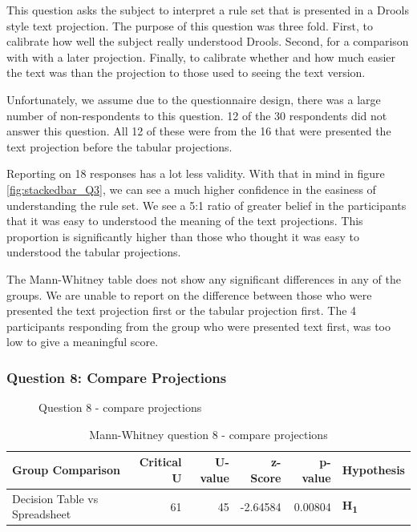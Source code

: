This question asks the subject to interpret a rule set that is presented in a Drools style text projection.
The purpose of this question was three fold.
First, to calibrate how well the subject really understood Drools.
Second, for a comparison with with a later projection.
Finally, to calibrate whether and how much easier the text was than the projection to those used to seeing the text version.

Unfortunately, we assume due to the questionnaire design, there was a large number of non-respondents to this question. 
12 of the 30 respondents did not answer this question.
All 12 of these were from the 16 that were presented the text projection before the tabular projections.

Reporting on 18 responses has a lot less validity.
With that in mind in figure \ref{fig:stackedbar_Q3}, we can see a much higher confidence in the easiness of understanding the rule set.
We see a 5:1 ratio of greater belief in the participants that it was easy to understood the meaning of the text projections.
This proportion is significantly higher than those who thought it was easy to understood the tabular projections.

The Mann-Whitney table does not show any significant differences in any of the groups.
We are unable to report on the difference between those who were presented the text projection first or the tabular projection first.
The 4 participants responding from the group who were presented text first, was too low to give a meaningful score.

\pagebreak
\subsubsection{Question 8: Compare Projections}

\begin{figure}[H]
    \centering
    \caption{Question 8 - compare projections}
    \label{fig:stackedbar_Q4}
\end{figure}

\begin{table}[H]
    \begin{center}
        \begin{tabular}{ |l ||r |r |r | r|l | } 
            \hline
            Group Comparison                 & Critical U & U-value & z-Score  & p-value & Hypothesis         \\
            \hline
            \hline
            Decision Table vs Spreadsheet    & 61         & 45      &  -2.64584& 0.00804 & \textbf{H\textsubscript{1}} \\ 
            \hline
        \end{tabular}
    \end{center}
    \caption{Mann-Whitney question 8 - compare projections}
    \label{table:mannwhitneyQ4}
\end{table}

